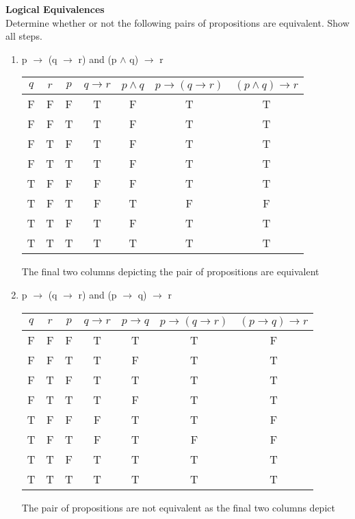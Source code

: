\documentclass[12pt]{article}
\begin{document}
\textbf{Logical Equivalences}\\

\indent Determine whether or not the following pairs of propositions are equivalent. Show all steps.\\

\begin{enumerate}



\item

p $\to$ (q $\to$ r) and (p $\land$ q) $\to$ r



\begin{tabular}{|c|c|c|c|c|c|c|}
\hline
$q$ & $r$ & $p$ & $q \to r$ & $p \land q$ & $p \to (q \to r)$ & $(p \land q) \to r$ \\
\hline
F & F & F & T & F & T & T \\
F & F & T & T & F & T & T \\
F & T & F & T & F & T & T \\
F & T & T & T & F & T & T \\
T & F & F & F & F & T & T \\
T & F & T & F & T & F & F \\
T & T & F & T & F & T & T \\
T & T & T & T & T & T & T \\
\hline
\end{tabular}

The final two columns depicting the pair of propositions are equivalent
\item

p $\to$ (q $\to$ r) and (p $\to$ q) $\to$ r



\begin{tabular}{|c|c|c|c|c|c|c|}
\hline
$q$ & $r$ & $p$ & $q \to r$ & $p \to q$ & $p \to (q \to r)$ & $(p \to q) \to r$ \\
\hline
F & F & F & T & T & T & F \\
F & F & T & T & F & T & T \\
F & T & F & T & T & T & T \\
F & T & T & T & F & T & T \\
T & F & F & F & T & T & F \\
T & F & T & F & T & F & F \\
T & T & F & T & T & T & T \\
T & T & T & T & T & T & T \\
\hline
\end{tabular}

The pair of propositions are not equivalent as the final two columns depict
\end{enumerate}
\end{document}
